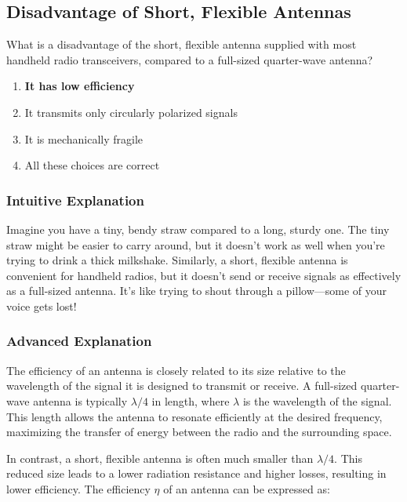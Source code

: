 \subsection{Disadvantage of Short, Flexible Antennas}
\label{T9A04}

\begin{tcolorbox}[colback=gray!10!white,colframe=black!75!black,title=T9A04]
What is a disadvantage of the short, flexible antenna supplied with most handheld radio transceivers, compared to a full-sized quarter-wave antenna?
\begin{enumerate}[label=\Alph*)]
    \item \textbf{It has low efficiency}
    \item It transmits only circularly polarized signals
    \item It is mechanically fragile
    \item All these choices are correct
\end{enumerate}
\end{tcolorbox}

\subsubsection{Intuitive Explanation}
Imagine you have a tiny, bendy straw compared to a long, sturdy one. The tiny straw might be easier to carry around, but it doesn't work as well when you're trying to drink a thick milkshake. Similarly, a short, flexible antenna is convenient for handheld radios, but it doesn't send or receive signals as effectively as a full-sized antenna. It's like trying to shout through a pillow—some of your voice gets lost!

\subsubsection{Advanced Explanation}
The efficiency of an antenna is closely related to its size relative to the wavelength of the signal it is designed to transmit or receive. A full-sized quarter-wave antenna is typically $\lambda/4$ in length, where $\lambda$ is the wavelength of the signal. This length allows the antenna to resonate efficiently at the desired frequency, maximizing the transfer of energy between the radio and the surrounding space.

In contrast, a short, flexible antenna is often much smaller than $\lambda/4$. This reduced size leads to a lower radiation resistance and higher losses, resulting in lower efficiency. The efficiency $\eta$ of an antenna can be expressed as:

